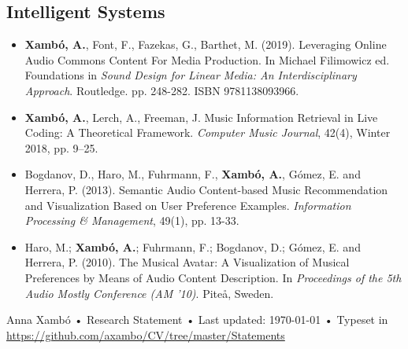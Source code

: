 \documentclass[10pt, a4paper]{article}
\begin{document}
\subsection*{Intelligent Systems}

\begin{itemize}
\item \textbf{Xambó, A.}, Font, F., Fazekas, G., Barthet, M. (2019). Leveraging Online Audio Commons Content For Media Production. In Michael Filimowicz ed. Foundations in \emph{Sound Design for Linear Media: An Interdisciplinary Approach}. Routledge. pp. 248-282. ISBN 9781138093966.
\item \textbf{Xambó, A.}, Lerch, A., Freeman, J. Music Information Retrieval in Live Coding: A Theoretical Framework. \emph{Computer Music Journal}, 42(4), Winter 2018, pp. 9--25.
\item Bogdanov, D., Haro, M., Fuhrmann, F., \textbf{Xambó, A.}, Gómez, E. and Herrera, P. (2013). Semantic Audio Content-based Music Recommendation and Visualization Based on User Preference Examples. \emph{Information Processing \& Management}, 49(1), pp. 13-33.
\item Haro, M.; \textbf{Xambó, A.}; Fuhrmann, F.; Bogdanov, D.; Gómez, E. and Herrera, P. (2010). The Musical Avatar: A Visualization of Musical Preferences by Means of Audio Content Description. In \emph{Proceedings of the 5th Audio Mostly Conference (AM '10)}. Piteå, Sweden.
\end{itemize}

\vfill{}

\begin{center}
{\scriptsize  Anna Xambó •\- Research Statement •\- Last updated: \today\- •\- %
Typeset in \href{http://nitens.org/taraborelli/cvtex}{
\XeTeX }\\

\href{https://github.com/axambo/CV/tree/master/Statements}{https://github.com/axambo/CV/tree/master/Statements}}
\end{center}
\end{document}
